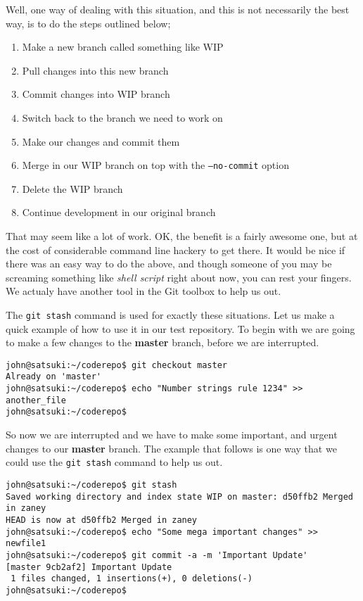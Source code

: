 Well, one way of dealing with this situation, and this is not necessarily the best way, is to do the steps outlined below;

\begin{enumerate}
\item Make a new branch called something like WIP
\item Pull changes into this new branch
\item Commit changes into WIP branch
\item Switch back to the branch we need to work on
\item Make our changes and commit them
\item Merge in our WIP branch on top with the \texttt{--no-commit} option
\item Delete the WIP branch
\item Continue development in our original branch
\end{enumerate}

That may seem like a lot of work.  OK, the benefit is a fairly awesome one, but at the cost of considerable command line hackery to get there.  It would be nice if there was an easy way to do the above, and though someone of you may be screaming something like \emph{shell script} right about now, you can rest your fingers.  We actualy have another tool in the Git toolbox to help us out.

The \texttt{git stash} command is used for exactly these situations.  Let us make a quick example of how to use it in our test repository.  To begin with we are going to make a few changes to the \textbf{master} branch, before we are interrupted.

\begin{Verbatim}[frame=leftline,framerule=1mm,fontsize=\relsize{-3}] 
john@satsuki:~/coderepo$ git checkout master
Already on 'master'
john@satsuki:~/coderepo$ echo "Number strings rule 1234" >> another_file
john@satsuki:~/coderepo$ 
\end{Verbatim}

So now we are interrupted and we have to make some important, and urgent changes to our \textbf{master} branch.  The example that follows is one way that we could use the \texttt{git stash} command to help us out.  

\begin{Verbatim}[frame=leftline,framerule=1mm,fontsize=\relsize{-3}] 
john@satsuki:~/coderepo$ git stash
Saved working directory and index state WIP on master: d50ffb2 Merged in zaney
HEAD is now at d50ffb2 Merged in zaney
john@satsuki:~/coderepo$ echo "Some mega important changes" >> newfile1
john@satsuki:~/coderepo$ git commit -a -m 'Important Update'
[master 9cb2af2] Important Update
 1 files changed, 1 insertions(+), 0 deletions(-)
john@satsuki:~/coderepo$ 
\end{Verbatim}

